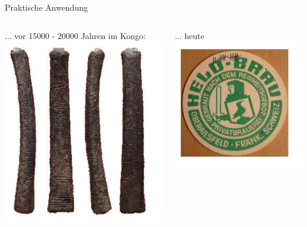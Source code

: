 \documentclass[12pt%
,aspectratio=169%
]{beamer}
\begin{document}
\begin{frame}{Praktische Anwendung}
\begin{columns}[T] %
\begin{column}{.58\textwidth}
... vor 15000 - 20000 Jahren im Kongo:
\includegraphics[scale=0.3]{pictures/stick}
\end{column}%
\hfill%
\begin{column}{.38\textwidth}
... heute
\centering
\includegraphics[scale=0.3]{pictures/beer}
\end{column}%
\end{columns}
\end{frame}
\end{document}
